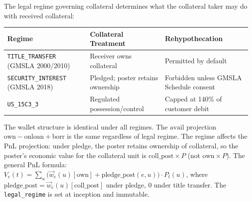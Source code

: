 \documentclass[11pt,a4paper]{article}
\begin{document}
The legal regime governing collateral determines what the collateral taker may do with received collateral:

\begin{center}
\small
\begin{tabular}{l p{4.2cm} p{4.2cm}}
\toprule
\textbf{Regime} & \textbf{Collateral Treatment} & \textbf{Rehypothecation} \\
\midrule
\texttt{TITLE\_TRANSFER} (GMSLA 2000/2010) & Receiver owns collateral & Permitted by default \\
\texttt{SECURITY\_INTEREST} (GMSLA 2018) & Pledged; poster retains ownership & Forbidden unless GMSLA Schedule consent \\
\texttt{US\_15C3\_3} & Regulated possession/control & Capped at 140\% of customer debit \\
\bottomrule
\end{tabular}
\end{center}

The wallet structure is identical under all regimes. The $\mathrm{avail}$ projection $\mathrm{own} - \mathrm{onloan} + \mathrm{borr}$ is the same regardless of legal regime. The regime affects the PnL projection: under pledge, the poster retains ownership of collateral, so the poster's economic value for the collateral unit is $\mathrm{coll\_post} \times P$ (not $\mathrm{own} \times P$). The general PnL formula: $V_e(t) = \sum_u \bigl(\vec{w}_e(u)[\mathrm{own}] + \mathrm{pledge\_post}(e,u)\bigr) \cdot P_t(u)$, where $\mathrm{pledge\_post} = \vec{w}_e(u)[\mathrm{coll\_post}]$ under pledge, $0$ under title transfer. The \texttt{legal\_regime} is set at inception and immutable.
\end{document}
